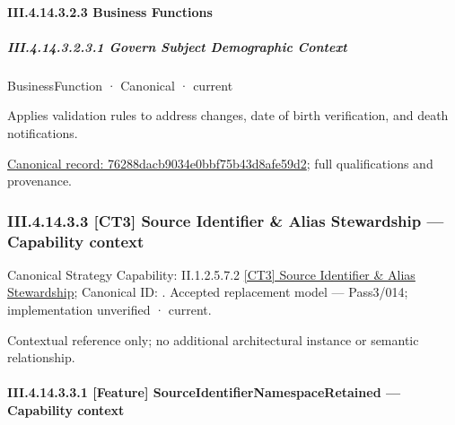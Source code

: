 \paragraph*{III.4.14.3.2.3 Business Functions}
\label{navigation:III.4.14.3.2.3}

\subparagraph*{III.4.14.3.2.3.1 Govern Subject Demographic Context}
\label{navigation:III.4.14.3.2.3.1}

\label{element:76288dacb9034e0bbf75b43d8afe59d2}
{\small BusinessFunction · Canonical · current}\par

Applies validation rules to address changes, date of birth verification, and death notifications.


{\footnotesize \href{../../../../../../../../continuum/business/business-function/76288dacb9034e0bbf75b43d8afe59d2.md}{Canonical record: 76288dacb9034e0bbf75b43d8afe59d2}; full qualifications and provenance.}\par
\subsubsection*{III.4.14.3.3 [CT3] Source Identifier \& Alias Stewardship — Capability context}
\label{navigation:III.4.14.3.3}

{\small Canonical Strategy Capability: II.1.2.5.7.2 \hyperref[element:d928bd4033a84a5e9fde8ec88e31bbd6]{[CT3] Source Identifier \& Alias Stewardship}; Canonical ID: \texttt{}. Accepted replacement model — Pass3/014; implementation unverified · current.}\par
Contextual reference only; no additional architectural instance or semantic relationship.\par
\paragraph*{III.4.14.3.3.1 [Feature] SourceIdentifierNamespaceRetained — Capability context}
\label{navigation:III.4.14.3.3.1}

